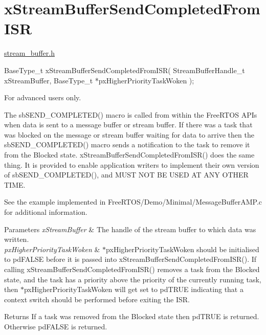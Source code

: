 \hypertarget{group__x_stream_buffer_send_completed_from_i_s_r}{}\section{x\+Stream\+Buffer\+Send\+Completed\+From\+I\+SR}
\label{group__x_stream_buffer_send_completed_from_i_s_r}
\mbox{\hyperlink{stream__buffer_8h_source}{stream\+\_\+buffer.\+h}}


\begin{DoxyPre}
BaseType\_t xStreamBufferSendCompletedFromISR( StreamBufferHandle\_t xStreamBuffer, BaseType\_t *pxHigherPriorityTaskWoken );
\end{DoxyPre}


For advanced users only.

The sb\+S\+E\+N\+D\+\_\+\+C\+O\+M\+P\+L\+E\+T\+E\+D() macro is called from within the Free\+R\+T\+OS A\+P\+Is when data is sent to a message buffer or stream buffer. If there was a task that was blocked on the message or stream buffer waiting for data to arrive then the sb\+S\+E\+N\+D\+\_\+\+C\+O\+M\+P\+L\+E\+T\+E\+D() macro sends a notification to the task to remove it from the Blocked state. x\+Stream\+Buffer\+Send\+Completed\+From\+I\+S\+R() does the same thing. It is provided to enable application writers to implement their own version of sb\+S\+E\+N\+D\+\_\+\+C\+O\+M\+P\+L\+E\+T\+E\+D(), and M\+U\+ST N\+OT BE U\+S\+ED AT A\+NY O\+T\+H\+ER T\+I\+ME.

See the example implemented in Free\+R\+T\+O\+S/\+Demo/\+Minimal/\+Message\+Buffer\+A\+M\+P.\+c for additional information.


\begin{DoxyParams}{Parameters}
{\em x\+Stream\+Buffer} & The handle of the stream buffer to which data was written.\\
\hline
{\em px\+Higher\+Priority\+Task\+Woken} & $\ast$px\+Higher\+Priority\+Task\+Woken should be initialised to pd\+F\+A\+L\+SE before it is passed into x\+Stream\+Buffer\+Send\+Completed\+From\+I\+S\+R(). If calling x\+Stream\+Buffer\+Send\+Completed\+From\+I\+S\+R() removes a task from the Blocked state, and the task has a priority above the priority of the currently running task, then $\ast$px\+Higher\+Priority\+Task\+Woken will get set to pd\+T\+R\+UE indicating that a context switch should be performed before exiting the I\+SR.\\
\hline
\end{DoxyParams}
\begin{DoxyReturn}{Returns}
If a task was removed from the Blocked state then pd\+T\+R\+UE is returned. Otherwise pd\+F\+A\+L\+SE is returned. 
\end{DoxyReturn}
